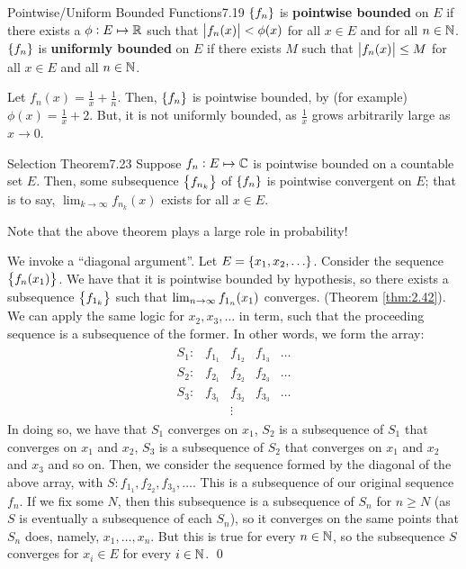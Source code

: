 \setcounter{rudin}{18}

\begin{definition}{Pointwise/Uniform Bounded Functions}{7.19}
    $\set{f_n}$ is \textbf{pointwise bounded} on $E$ if there exists a $\phi: E \mapsto \mathbb{R}$ such that $\abs{f_n(x)} < \phi(x)$ for all $x \in E$ and for all $n \in \mathbb{N}$. $\set{f_n}$ is \textbf{uniformly bounded} on $E$ if there exists $M$ such that $\abs{f_n(x)} \leq M$ for all $x \in E$ and all $n \in \mathbb{N}$.
\end{definition}

\begin{nexample}{}{}
    Let $f_n(x) = \frac{1}{x} + \frac{1}{n}$. Then, $\set{f_n}$ is pointwise bounded, by (for example) $\phi(x) = \frac{1}{x} + 2$. But, it is not uniformly bounded, as $\frac{1}{x}$ grows arbitrarily large as $x \rightarrow 0$. 
\end{nexample}

\setcounter{rudin}{22}
\begin{theorem}{Selection Theorem}{7.23}
    Suppose $f_n : E \mapsto \mathbb{C}$ is pointwise bounded on a countable set $E$. Then, some subsequence $\set{f_{n_k}}$ of $\set{f_n}$ is pointwise convergent on $E$; that is to say, $\lim_{k \rightarrow \infty} f_{n_k}(x)$ exists for all $x \in E$. 
\end{theorem}
\noindent Note that the above theorem plays a large role in probability!

\begin{nproof}
    We invoke a ``diagonal argument''. Let $E = \set{x_1, x_2, \ldots}$. Consider the sequence $\set{f_n(x_1)}$. We have that it is pointwise bounded by hypothesis, so there exists a subsequence $\set{f_{1_k}}$ such that $\lim_{n \rightarrow \infty} f_{1_n}(x_1)$ converges. (Theorem \ref{thm:2.42}). We can apply the same logic for $x_2, x_3, \ldots$ in term, such that the proceeding sequence is a subsequence of the former. In other words, we form the array:
    \begin{align*}
        \begin{array}{ccccc}
            S_1: & f_{1_1} & f_{1_2} & f_{1_3} & \ldots \\
            S_2: & f_{2_1} & f_{2_2} & f_{2_3} & \ldots \\
            S_3: & f_{3_1} & f_{3_2} & f_{3_3} & \ldots \\
            & & \vdots & &
        \end{array}
    \end{align*}
    In doing so, we have that $S_1$ converges on $x_1$, $S_2$ is a subsequence of $S_1$ that converges on $x_1$ and $x_2$, $S_3$ is a subsequence of $S_2$ that converges on $x_1$ and $x_2$ and $x_3$ and so on. Then, we consider the sequence formed by the diagonal of the above array, with $S: f_{1_1}, f_{2_2}, f_{3_3}, \ldots$. This is a subsequence of our original sequence $f_n$. If we fix some $N$, then this subsequence is a subsequence of $S_n$ for $n \geq N$ (as $S$ is eventually a subsequence of each $S_n$), so it converges on the same points that $S_n$ does, namely, $x_1, \ldots, x_n$. But this is true for every $n \in \mathbb{N}$, so the subsequence $S$ converges for $x_i \in E$ for every $i \in \mathbb{N}$. \qed
\end{nproof}

